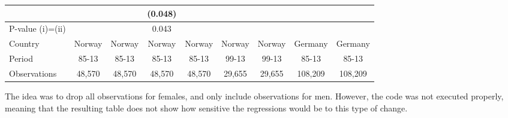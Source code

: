 \begin{table}[htb]
{\begin{tabular}{l*{8}{c}}
                &                  &                  &  (0.048)         &                  &                  &                  &                  &                  \\
\midrule
P-value (i)=(ii)&                  &                  &    0.043         &                  &                  &                  &                  &                  \\
\midrule Country&   Norway         &   Norway         &   Norway         &   Norway         &   Norway         &   Norway         &  Germany         &  Germany         \\
Period          &    85-13         &    85-13         &    85-13         &    85-13         &    99-13         &    99-13         &    85-13         &    85-13         \\
Observations    &   48,570         &   48,570         &   48,570         &   48,570         &   29,655         &   29,655         &  108,209         &  108,209         \\
\bottomrule
\end{tabular}
}
\end{table}
The idea was to drop all observations for females, and only include observations for men. However, the code was not executed properly, meaning that the resulting  table does not show how sensitive the regressions would be to this type of change. 